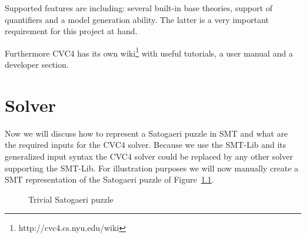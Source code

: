 Supported features are including: several built-in base theories, support of quantifiers and a model generation ability. The latter is a very important requirement for this project at hand.

Furthermore CVC4 has its own wiki\footnote{http://cvc4.cs.nyu.edu/wiki} with useful tutorials, a user manual and a developer section.

\chapter{Solver} \label{The Solver}
Now we will discuss how to represent a Satogaeri puzzle in SMT and what are the required inputs for the CVC4 solver. Because we use the SMT-Lib and its generalized input syntax the CVC4 solver could be replaced by any other solver supporting the SMT-Lib. For illustration purposes we will now manually create a SMT representation of the Satogaeri puzzle of Figure~\ref{fig:solver_example}.
\begin{figure}
  \centering
  \caption{Trivial Satogaeri puzzle}
  \label{fig:solver_example}
\end{figure}

